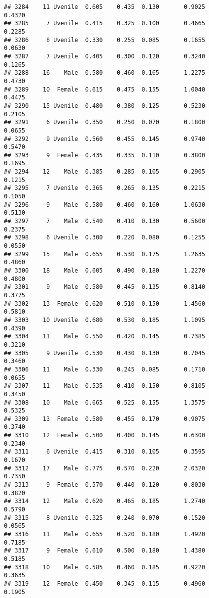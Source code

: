 \documentclass[
]{article}
\begin{document}
\begin{verbatim}
## 3284    11 Uvenile  0.605    0.435  0.130       0.9025         0.4320
## 3285     7 Uvenile  0.415    0.325  0.100       0.4665         0.2285
## 3286     8 Uvenile  0.330    0.255  0.085       0.1655         0.0630
## 3287     7 Uvenile  0.405    0.300  0.120       0.3240         0.1265
## 3288    16    Male  0.580    0.460  0.165       1.2275         0.4730
## 3289    10  Female  0.615    0.475  0.155       1.0040         0.4475
## 3290    15 Uvenile  0.480    0.380  0.125       0.5230         0.2105
## 3291     6 Uvenile  0.350    0.250  0.070       0.1800         0.0655
## 3292     9 Uvenile  0.560    0.455  0.145       0.9740         0.5470
## 3293     9  Female  0.435    0.335  0.110       0.3800         0.1695
## 3294    12    Male  0.385    0.285  0.105       0.2905         0.1215
## 3295     7 Uvenile  0.365    0.265  0.135       0.2215         0.1050
## 3296     9    Male  0.580    0.460  0.160       1.0630         0.5130
## 3297     7    Male  0.540    0.410  0.130       0.5600         0.2375
## 3298     6 Uvenile  0.300    0.220  0.080       0.1255         0.0550
## 3299    15    Male  0.655    0.530  0.175       1.2635         0.4860
## 3300    18    Male  0.605    0.490  0.180       1.2270         0.4800
## 3301     9    Male  0.580    0.445  0.135       0.8140         0.3775
## 3302    13  Female  0.620    0.510  0.150       1.4560         0.5810
## 3303    10 Uvenile  0.680    0.530  0.185       1.1095         0.4390
## 3304    11    Male  0.550    0.420  0.145       0.7385         0.3210
## 3305     9 Uvenile  0.530    0.430  0.130       0.7045         0.3460
## 3306    11    Male  0.330    0.245  0.085       0.1710         0.0655
## 3307    11    Male  0.535    0.410  0.150       0.8105         0.3450
## 3308    10    Male  0.665    0.525  0.155       1.3575         0.5325
## 3309    13  Female  0.580    0.455  0.170       0.9075         0.3740
## 3310    12  Female  0.500    0.400  0.145       0.6300         0.2340
## 3311     6 Uvenile  0.415    0.310  0.105       0.3595         0.1670
## 3312    17    Male  0.775    0.570  0.220       2.0320         0.7350
## 3313     9  Female  0.570    0.440  0.120       0.8030         0.3820
## 3314    12    Male  0.620    0.465  0.185       1.2740         0.5790
## 3315     8 Uvenile  0.325    0.240  0.070       0.1520         0.0565
## 3316    11    Male  0.655    0.520  0.180       1.4920         0.7185
## 3317     9  Female  0.610    0.500  0.180       1.4380         0.5185
## 3318    10    Male  0.585    0.460  0.185       0.9220         0.3635
## 3319    12  Female  0.450    0.345  0.115       0.4960         0.1905

\end{verbatim}
\end{document}
